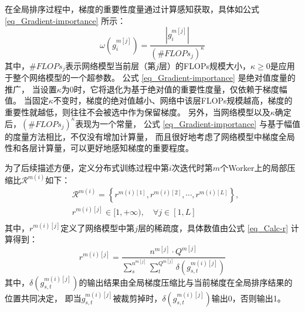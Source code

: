 \documentclass{xdupgthesis}
\begin{document}
在全局排序过程中，梯度的重要性度量通过计算感知获取，具体如公式 \eqref{eq_Gradient-importance} 所示：
\begin{equation}
    \omega\left( g^{m[j]}_{i} \right) 
        = \frac{\left| g^{m[j]}_{i} \right|}
            {\left( \# FLOPs_{j} \right)^{\kappa}}
    \label{eq_Gradient-importance}
\end{equation}
其中，$\# FLOPs_{j}$表示网络模型当前层（第$j$层）的FLOPs规模大小，$\kappa \geq 0$是应用于整个网络模型的一个超参数。
公式 \eqref{eq_Gradient-importance} 是绝对值度量的推广，
当设置$\kappa$为0时，它将退化为基于绝对值的重要性度量，仅依赖于梯度幅值。
当固定$\kappa$不变时，梯度的绝对值越小、网络中该层FLOPs规模越高，梯度的重要性就越低，则往往不会被选中作为保留梯度。
另外，当网络模型以及$\kappa$确定后，$\left( \# FLOPs_{j} \right)^{\kappa}$表现为一个常量，
公式 \eqref{eq_Gradient-importance} 与基于幅值的度量方法相比，不仅没有增加计算量，
而且很好地考虑了网络模型中梯度全局性和各层计算量，可以更好地感知梯度的重要程度。

为了后续描述方便，定义分布式训练过程中第$i$次迭代时第$m$个Worker上的局部压缩比$\mathcal{R}^{m(i)}$如下：
\begin{equation}
    \begin{aligned}
    & \mathcal{R}^{m(i)} = \left\{
            r^{m(i)[1]}, r^{m(i)[2]}, \cdots, r^{m(i)[L]}
        \right\}, \\
    & r^{m(i)[j]} \in [1, +\infty), \quad \forall j \in \left[ 1, L\right] \\
    \end{aligned}
    \label{eq_iter-i-worker-m-r}
\end{equation}
其中，$r^{m(i)[j]}$定义了网络模型中第$j$层的稀疏度，具体数值由公式 \eqref{eq_Calc-r} 计算得到： 
\begin{equation}
    r^{m(i)[j]} = \frac{n^{m[j]} \cdot Q^{m[j]}}
        {\sum_{s}^{n^{m[j]}}
            \sum_{t}^{Q^{m[j]}}
                \delta\left(
                    g^{m(i)[j]}_{{s,t}}
                \right)}
    \label{eq_Calc-r}
\end{equation}
其中，$\delta\left(g^{m(i)[j]}_{{s,t}}\right)$的输出结果由全局梯度压缩比与当前梯度在全局排序结果的位置共同决定，
即当$g^{m(i)[j]}_{{s,t}}$被裁剪掉时，$\delta\left(g^{m(i)[j]}_{{s,t}}\right)$输出0，否则输出1。
\end{document}

